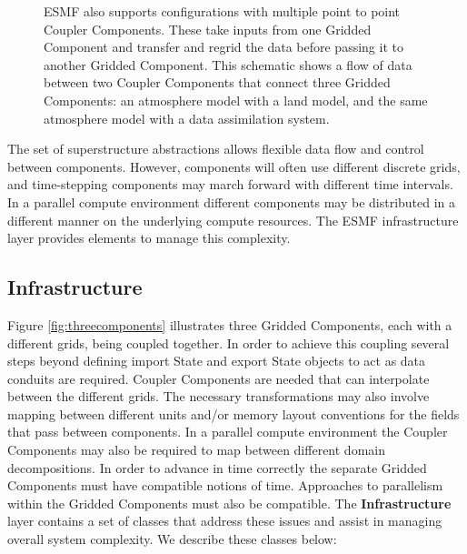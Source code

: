 \begin{figure}
\caption{ESMF also supports configurations with multiple point to point Coupler Components. 
These take inputs from one Gridded
Component and transfer and regrid the data before passing it to another Gridded Component. This schematic shows a 
flow of data between two Coupler Components that connect three Gridded Components:  an atmosphere model with a land model, and the same atmosphere model with a data assimilation system.}
\label{fig:point2point}
\end{figure}

The set of superstructure abstractions allows flexible data flow and control between components. However, 
components will often use different discrete grids, and time-stepping components may march forward with different time
intervals. In a parallel compute environment different components may be distributed in a different manner on the
underlying compute resources. The ESMF infrastructure layer provides elements to manage this complexity.

\subsection{Infrastructure}
\label{sec:infrastructure}
Figure \ref{fig:threecomponents} illustrates three Gridded Components, each with a different grids, being coupled together. In 
order to achieve this coupling several steps beyond defining import State and 
export State objects to act
as data conduits are required. Coupler Components are needed that can interpolate between the different
grids.  The necessary transformations may also involve mapping between different units and/or memory layout conventions for the fields that
pass between components. In a parallel compute environment the Coupler Components may also be required to map between different 
domain decompositions. In order to advance in time correctly the separate Gridded Components must have compatible notions
of time. Approaches to parallelism within the Gridded Components must also be compatible. The {\bf Infrastructure} layer
contains a set of classes that address these issues and assist in managing overall system complexity. We describe
these classes below:

